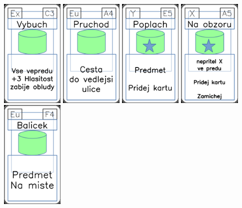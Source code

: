 \documentclass[a4paper]{article}
\begin{document}
	\includegraphics[width=3.0cm]{img-4_12}
	\includegraphics[width=3.0cm]{img-4_33}
	\includegraphics[width=3.0cm]{img-5_24}
	\includegraphics[width=3.0cm]{img-5_4}
	\includegraphics[width=3.0cm]{img-4_28}
\end{document}
